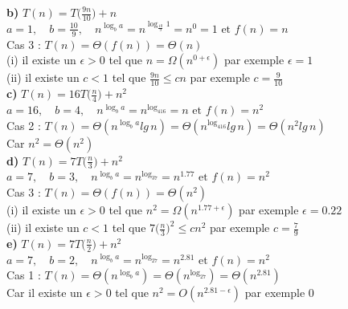 \documentclass[12pt]{article}
\begin{document}
\textbf{b) } \(T(n)=T\big(\frac{9n}{10}\big)+n\) \\

\(a=1, \quad b=\frac{10}{9}, \quad n^{\log_ba} = n^{\log_{\frac{10}{9}}1}=n^0=1 \text{ et } f(n) = n\) \\

Cas 3 : \(T(n)=\Theta(f(n))= \Theta(n) \) \\

(i) il existe un \(\epsilon>0\) tel que \(n = \Omega(n^{0+\epsilon}) \) par exemple \(\epsilon=1\) \\
(ii) il existe un \(c < 1\) tel que \( \frac{9n}{10} \leq cn \) par exemple \(c=\frac{9}{10}\) \\

\textbf{c) } \(T(n)=16T\big(\frac{n}{4}\big)+n^2\) \\

\(a=16, \quad b=4, \quad n^{\log_ba} = n^{\log_416}=n \text{ et } f(n) = n^2\) \\

Cas 2 : \(T(n) = \Theta(n^{\log_ba}lg \, n) = \Theta(n^{\log_416}lg \, n) = \Theta(n^2lg \, n) \) \\

Car \(n^2 = \Theta(n^2) \) \\

\textbf{d) } \(T(n)=7T\big(\frac{n}{3}\big)+n^2\) \\

\(a=7, \quad b=3, \quad n^{\log_ba} = n^{\log_37}=n^{1.77} \text{ et } f(n) = n^2\) \\

Cas 3 : \(T(n)=\Theta(f(n))= \Theta(n^2) \) \\

(i) il existe un \(\epsilon>0\) tel que \(n^2 = \Omega(n^{1.77+\epsilon}) \) par exemple \(\epsilon=0.22\) \\
(ii) il existe un \(c < 1\) tel que \( 7 \big(\frac{n}{3} \big)^2 \leq cn^2 \) par exemple \(c=\frac{7}{9}\) \\

\textbf{e) } \(T(n)=7T\big(\frac{n}{2}\big)+n^2\) \\

\(a=7, \quad b=2, \quad n^{\log_ba} = n^{\log_27}=n^{2.81} \text{ et } f(n) = n^2\) \\

Cas 1 : \(T(n) = \Theta(n^{\log_ba}) = \Theta(n^{\log_27}) = \Theta(n^{2.81}) \) \\

Car il existe un \(\epsilon>0\) tel que \(n^2 = O(n^{2.81-\epsilon}) \) par exemple 0 \\
\end{document}
